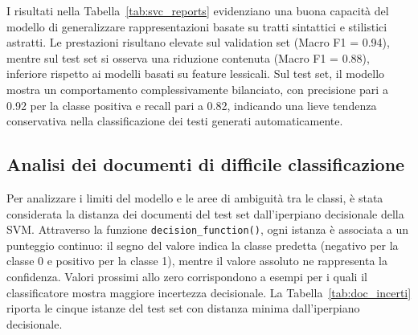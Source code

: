 \documentclass{article}
\begin{document}
I risultati nella Tabella~\ref{tab:svc_reports} evidenziano una buona capacità del modello di generalizzare rappresentazioni basate su tratti sintattici e stilistici astratti. Le prestazioni risultano elevate sul validation set (Macro F1 = 0.94), mentre sul test set si osserva una riduzione contenuta (Macro F1 = 0.88), inferiore rispetto ai modelli basati su feature lessicali. Sul test set, il modello mostra un comportamento complessivamente bilanciato, con precisione pari a 0.92 per la classe positiva e recall pari a 0.82, indicando una lieve tendenza conservativa nella classificazione dei testi generati automaticamente.

\subsection{Analisi dei documenti di difficile classificazione}

Per analizzare i limiti del modello e le aree di ambiguità tra le classi, è stata considerata la distanza dei documenti del test set dall’iperpiano decisionale della SVM. Attraverso la funzione \texttt{decision\_function()}, ogni istanza è associata a un punteggio continuo: il segno del valore indica la classe predetta (negativo per la classe 0 e positivo per la classe 1), mentre il valore assoluto ne rappresenta la confidenza. Valori prossimi allo zero corrispondono a esempi per i quali il classificatore mostra maggiore incertezza decisionale.
La Tabella~\ref{tab:doc_incerti} riporta le cinque istanze del test set con distanza minima dall’iperpiano decisionale.
\end{document}
